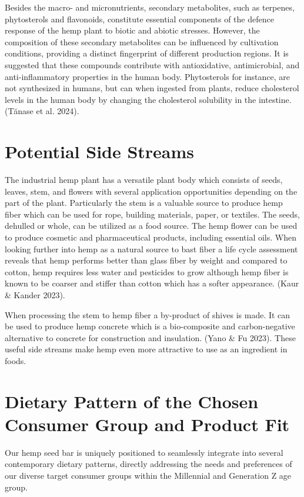 \vspace{1em}
Besides the macro- and micronutrients, secondary metabolites, such as terpenes, phytosterols and flavonoids, constitute essential components of the defence response of the hemp plant to biotic and abiotic stresses. However, the composition of these secondary metabolites can be influenced by cultivation conditions, providing a distinct fingerprint of different production regions. It is suggested that these compounds contribute with antioxidative, antimicrobial, and anti-inflammatory properties in the human body. Phytosterols for instance, are not synthesized in humans, but can when ingested from plants, reduce cholesterol levels in the human body by changing the cholesterol solubility in the intestine. (Tănase et al. 2024).

\section{Potential Side Streams}
The industrial hemp plant has a versatile plant body which consists of seeds, leaves, stem, and flowers with several application opportunities depending on the part of the plant. Particularly the stem is a valuable source to produce hemp fiber which can be used for rope, building materials, paper, or textiles. The seeds, dehulled or whole, can be utilized as a food source. The hemp flower can be used to produce cosmetic and pharmaceutical products, including essential oils. When looking further into hemp as a natural source to bast fiber a life cycle assessment reveals that hemp performs better than glass fiber by weight and compared to cotton, hemp requires less water and pesticides to grow although hemp fiber is known to be coarser and stiffer than cotton which has a softer appearance. (Kaur \& Kander 2023). 

\vspace{1em}
When processing the stem to hemp fiber a by-product of shives is made. It can be used to produce hemp concrete which is a bio-composite and carbon-negative alternative to concrete for construction and insulation. (Yano \& Fu 2023). These useful side streams make hemp even more attractive to use as an ingredient in foods. 

\section{Dietary Pattern of the Chosen Consumer Group and Product Fit}
Our hemp seed bar is uniquely positioned to seamlessly integrate into several contemporary dietary patterns, directly addressing the needs and preferences of our diverse target consumer groups within the Millennial and Generation Z age group.

